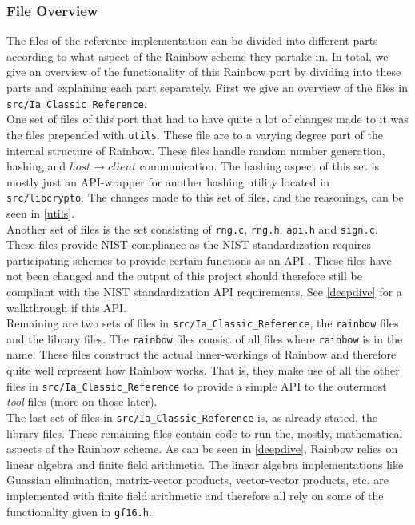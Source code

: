 \subsubsection{File Overview}
The files of the reference implementation can be divided into different parts according to what aspect of the Rainbow scheme they partake in. In total, we give an overview of the functionality of this Rainbow port by dividing into these parts and explaining each part separately. First we give an overview of the files in \texttt{src/Ia\_Classic\_Reference}.
\medskip\\
One set of files of this port that had to have quite a lot of changes made to it was the files prepended with \texttt{utils}. These file are to a varying degree part of the internal structure of Rainbow. These files handle random number generation, hashing and $host\rightarrow client$ communication. The hashing aspect of this set is mostly just an API-wrapper for another hashing utility located in \texttt{src/libcrypto}. The changes made to this set of files, and the reasonings, can be seen in \cref{utils}.
\medskip\\
Another set of files is the set consisting of \texttt{rng.c}, \texttt{rng.h}, \texttt{api.h} and \texttt{sign.c}. These files provide NIST-compliance as the NIST standardization requires participating schemes to provide certain functions as an API \cite{nistapi}. These files have not been changed and the output of this project should therefore still be compliant with the NIST standardization API requirements. See \cref{deepdive} for a walkthrough if this API.
\medskip\\
Remaining are two sets of files in \texttt{src/Ia\_Classic\_Reference}, the \texttt{rainbow} files and the library files. The \texttt{rainbow} files consist of all files where \texttt{rainbow} is in the name. These files construct the actual inner-workings of Rainbow and therefore quite well represent how Rainbow works. That is, they make use of all the other files in \texttt{src/Ia\_Classic\_Reference} to provide a simple API to the outermost \emph{tool}-files (more on those later).
\medskip\\
The last set of files in \texttt{src/Ia\_Classic\_Reference} is, as already stated, the library files. These remaining files contain code to run the, mostly, mathematical aspects of the Rainbow scheme. As can be seen in \cref{deepdive}, Rainbow relies on linear algebra and finite field arithmetic. The linear algebra implementations like Guassian elimination, matrix-vector products, vector-vector products, etc. are implemented with finite field arithmetic and therefore all rely on some of the functionality given in \texttt{gf16.h}.
